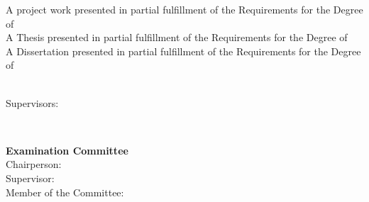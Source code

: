 \begin{titlepage}
\begin{center}
\if{}
  {\large A project work presented in partial fulfillment of the Requirements for the Degree of }\\[1.0cm]
\else\if{}
  	{\large A Thesis presented in partial fulfillment of the Requirements for the Degree of }\\[1.0cm]
\else
	{\large A Dissertation presented in partial fulfillment of the Requirements for the Degree of }\\[1.0cm]
\fi
{\LARGE \textbf{\DegreeName}}\\[1.0cm]
\begin{minipage}[t]{.4\textwidth}
  \center
  \begin{flushright}
    {\large Supervisors:~~}
  \end{flushright}
\end{minipage}%
\begin{minipage}[t]{.6\textwidth}
  \center
  \begin{flushleft}
    {\Supervisors}
  \end{flushleft}
\end{minipage}\\
%
\if{}
  \vspace*{\finalAdvisorsSpacing}
\else
  \vspace*{\draftAdvisorsSpacing}
\fi
%
\if{}
%
\begin{minipage}[t]{1\textwidth}
  \center
  {\Large \textbf{Examination Committee}}\\[.25cm]
  {\large Chairperson: \Chairperson}\\
  {\large Supervisor: \Advisor}\\
  {\large Member of the Committee: \CommitteeMembers}
\end{minipage}\\[1.0cm]
%
\fi
%

\if{}
 \vspace*{\dateSpacing}
\fi

{\Large \textbf{\Month\:\Year}}\\
\end{center}
\end{titlepage}
